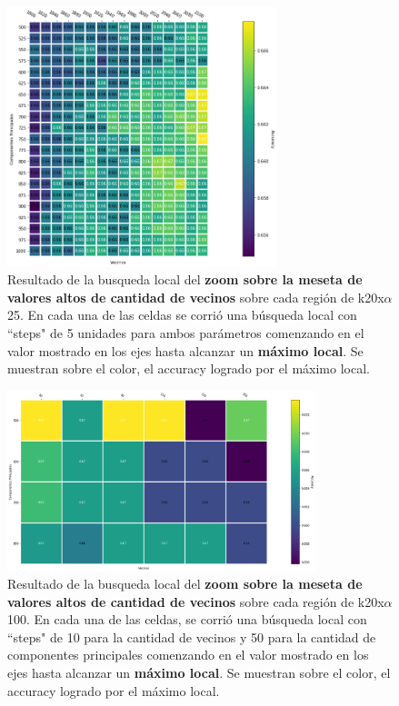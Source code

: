 \begin{figure}[h]
    \includegraphics[width=0.7\textwidth]{./img/pca_zoom1_grid.png}
    \centering
    \caption{Resultado de la busqueda local del \textbf{zoom sobre la meseta de valores altos de cantidad de vecinos} sobre cada región de k20x$\alpha$25. En cada una de las celdas se corrió
    una búsqueda local con ``steps" de 5 unidades para ambos parámetros comenzando en el valor mostrado en los ejes
    hasta alcanzar un \textbf{máximo local}. Se muestran sobre el color, el accuracy logrado
    por el máximo local.}
    \label{fig:pca-z1}
\end{figure}

\begin{figure}[h]
    \includegraphics[width=0.8\textwidth]{./img/pca_zoom2_grid.png}
    \centering
    \caption{Resultado de la busqueda local del \textbf{zoom sobre la meseta de valores altos de cantidad de vecinos} sobre cada región de k20x$\alpha$100. En cada una de las celdas, se corrió
    una búsqueda local con ``steps" de 10 para la cantidad de vecinos y 50 para la cantidad de componentes principales comenzando en el valor mostrado en los ejes
    hasta alcanzar un \textbf{máximo local}. Se muestran sobre el color, el accuracy logrado
    por el máximo local.}
    \label{fig:pca-z2}
\end{figure}

